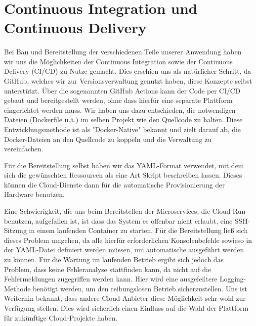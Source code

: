 \documentclass{article}
\begin{document}
\section{Continuous Integration und Continuous Delivery} %
\paragraph{}
Bei Bau und Bereitstellung der verschiedenen Teile unserer Anwendung haben wir uns die Möglichkeiten der Continuous Integration sowie der Continuous Delivery (CI/CD) zu Nutze gemacht. Dies erschien uns als natürlicher Schritt, da GitHub, welches wir zur Versionsverwaltung genutzt haben, diese Konzepte selbst unterstützt. Über die sogenannten GitHub Actions kann der Code per CI/CD gebaut und bereitgestellt werden, ohne dass hierfür eine separate Plattform eingerichtet werden muss. Wir haben uns dazu entschieden, die notwendigen Dateien (Dockerfile u.ä.) im selben Projekt wie den Quellcode zu halten. Diese Entwicklungsmethode ist als "{Docker-Native}"{ }bekannt und zielt darauf ab, die Docker-Dateien an den Quellcode zu koppeln und die Verwaltung zu vereinfachen.

Für die Bereitstellung selbst haben wir das YAML-Format verwendet, mit dem sich die gewünschten Ressourcen als eine Art Skript beschreiben lassen. Dieses können die Cloud-Dienste dann für die automatische Provisionierung der Hardware benutzen.

Eine Schwierigkeit, die uns beim Bereitstellen der Microservices, die Cloud Run benutzen, aufgefallen ist, ist dass das System es offenbar nicht erlaubt, eine SSH-Sitzung in einem laufenden Container zu starten. Für die Bereitstellung ließ sich dieses Problem umgehen, da alle hierfür erforderlichen Konsolenbefehle sowieso in der YAML-Datei definiert werden müssen, um automatische ausgeführt werden zu können. Für die Wartung im laufenden Betrieb ergibt sich jedoch das Problem, dass keine Fehleranalyse stattfinden kann, da nicht auf die Fehlermeldungen zugegriffen werden kann. Hier wird eine ausgefeiltere Logging-Methode benötigt werden, um den reibungslosen Betrieb sicherzustellen. Uns ist Weiterhin bekannt, dass andere Cloud-Anbieter diese Möglichkeit sehr wohl zur Verfügung stellen. Dies wird sicherlich einen Einfluss auf die Wahl der Plattform für zukünftige Cloud-Projekte haben.

\end{document}
